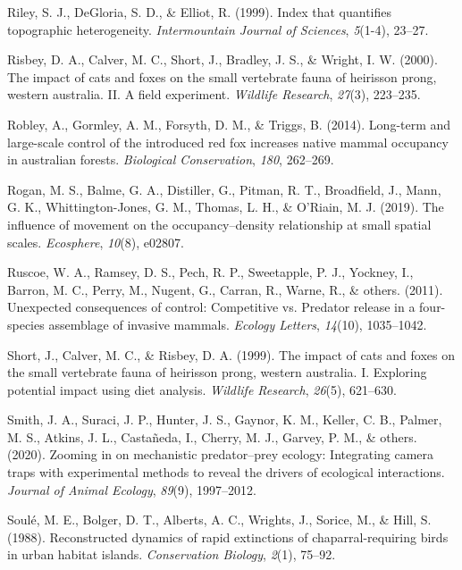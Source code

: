 \documentclass[]{elsarticle} %
\begin{document}
\leavevmode\hypertarget{ref-riley1999}{}%
Riley, S. J., DeGloria, S. D., \& Elliot, R. (1999). Index that quantifies topographic heterogeneity. \emph{Intermountain Journal of Sciences}, \emph{5}(1-4), 23--27.

\leavevmode\hypertarget{ref-risbey2000}{}%
Risbey, D. A., Calver, M. C., Short, J., Bradley, J. S., \& Wright, I. W. (2000). The impact of cats and foxes on the small vertebrate fauna of heirisson prong, western australia. II. A field experiment. \emph{Wildlife Research}, \emph{27}(3), 223--235.

\leavevmode\hypertarget{ref-robley2014}{}%
Robley, A., Gormley, A. M., Forsyth, D. M., \& Triggs, B. (2014). Long-term and large-scale control of the introduced red fox increases native mammal occupancy in australian forests. \emph{Biological Conservation}, \emph{180}, 262--269.

\leavevmode\hypertarget{ref-rogan2019}{}%
Rogan, M. S., Balme, G. A., Distiller, G., Pitman, R. T., Broadfield, J., Mann, G. K., Whittington-Jones, G. M., Thomas, L. H., \& O'Riain, M. J. (2019). The influence of movement on the occupancy--density relationship at small spatial scales. \emph{Ecosphere}, \emph{10}(8), e02807.

\leavevmode\hypertarget{ref-ruscoe2011}{}%
Ruscoe, W. A., Ramsey, D. S., Pech, R. P., Sweetapple, P. J., Yockney, I., Barron, M. C., Perry, M., Nugent, G., Carran, R., Warne, R., \& others. (2011). Unexpected consequences of control: Competitive vs. Predator release in a four-species assemblage of invasive mammals. \emph{Ecology Letters}, \emph{14}(10), 1035--1042.

\leavevmode\hypertarget{ref-short1999}{}%
Short, J., Calver, M. C., \& Risbey, D. A. (1999). The impact of cats and foxes on the small vertebrate fauna of heirisson prong, western australia. I. Exploring potential impact using diet analysis. \emph{Wildlife Research}, \emph{26}(5), 621--630.

\leavevmode\hypertarget{ref-smith2020}{}%
Smith, J. A., Suraci, J. P., Hunter, J. S., Gaynor, K. M., Keller, C. B., Palmer, M. S., Atkins, J. L., Castañeda, I., Cherry, M. J., Garvey, P. M., \& others. (2020). Zooming in on mechanistic predator--prey ecology: Integrating camera traps with experimental methods to reveal the drivers of ecological interactions. \emph{Journal of Animal Ecology}, \emph{89}(9), 1997--2012.

\leavevmode\hypertarget{ref-soule1988}{}%
Soulé, M. E., Bolger, D. T., Alberts, A. C., Wrights, J., Sorice, M., \& Hill, S. (1988). Reconstructed dynamics of rapid extinctions of chaparral-requiring birds in urban habitat islands. \emph{Conservation Biology}, \emph{2}(1), 75--92.
\end{document}
